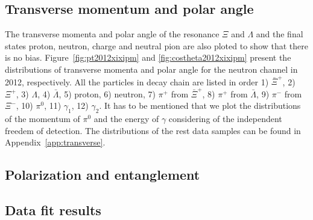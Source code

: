 \subsection{Transverse momentum and polar angle}
The transverse momenta and polar angle of the resonance
$\Xi$ and $\Lambda$ and the final states proton, neutron,
charge and neutral pion are also ploted to show that 
there is no bias. Figure~\ref{fig:pt2012xixipm} and 
\ref{fig:costheta2012xixipm} present the distributions of
transverse momenta and polar angle for the neutron channel in 2012, respectively.
All the particles in decay chain are listed in order 
1) $\bar{\Xi}^+$, 2) $\Xi^+$, 3) $\Lambda$, 4) $\bar{\Lambda}$,
5) proton, 6) neutron,
7) $\pi^+$ from $\bar{\Xi}^+$, 8) $\pi^+$ from $\bar{\Lambda}$,
9) $\pi^-$ from $\Xi^-$, 10) $\pi^0$, 11) $\gamma_1$, 12) $\gamma_2$.
It has to be mentioned that we plot the distributions of the momentum 
of $\pi^0$ and the energy of $\gamma$ considering of the 
independent freedem of detection. The distributions of the rest 
data samples can be found in Appendix~\ref{app:transverse}.







\subsection{Polarization and entanglement}
\subsection{Data fit results}


